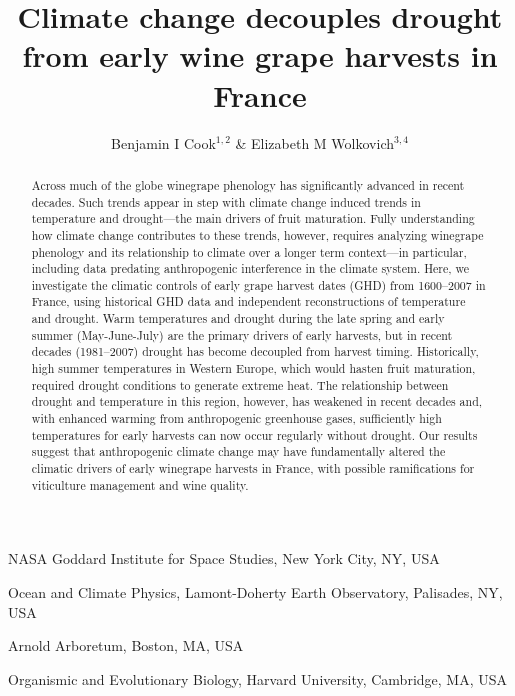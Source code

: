 \documentclass[final]{nature}
\title{Climate change decouples drought from early wine grape harvests in France} %
\author{Benjamin I Cook$^{1,2}$ \& Elizabeth M Wolkovich$^{3,4}$}
\begin{document}
\maketitle

\begin{affiliations}
 \item NASA Goddard Institute for Space Studies, New York City, NY, USA
 \item Ocean and Climate Physics, Lamont-Doherty Earth Observatory, Palisades, NY, USA
 \item Arnold Arboretum, Boston, MA, USA
 \item Organismic and Evolutionary Biology, Harvard University, Cambridge, MA, USA
\end{affiliations}

\begin{abstract}
Across much of the globe winegrape phenology has significantly advanced in recent decades\cite{Duchene:2005bd,Seguin2005,webb2011}. Such trends appear in step with climate change induced trends in temperature and drought---the main drivers of fruit maturation. Fully understanding how climate change contributes to these trends, however, requires analyzing winegrape phenology and its relationship to climate over a longer term context---in particular,  including data predating anthropogenic interference in the climate system. Here, we investigate the climatic controls of early grape harvest dates (GHD) from 1600--2007 in France, using historical GHD data\cite{Daux2012} and independent reconstructions of temperature\cite{Luterbacher2004} and drought\cite{CookOWDA2015,Pauling2006}. Warm temperatures and drought during the late spring and early summer (May-June-July) are the primary drivers of early harvests, but in recent decades (1981--2007) drought has become decoupled from harvest timing. Historically, high summer temperatures in Western Europe, which would hasten fruit maturation, required drought conditions to generate extreme heat. The relationship between drought and temperature in this region, however, has weakened in recent decades and, with enhanced warming from anthropogenic greenhouse gases, sufficiently high temperatures for early harvests can now occur regularly without drought. Our results suggest that anthropogenic climate change may have fundamentally altered the climatic drivers of early winegrape harvests in France, with possible ramifications for viticulture management and wine quality. 
\end{abstract}
\end{document}
